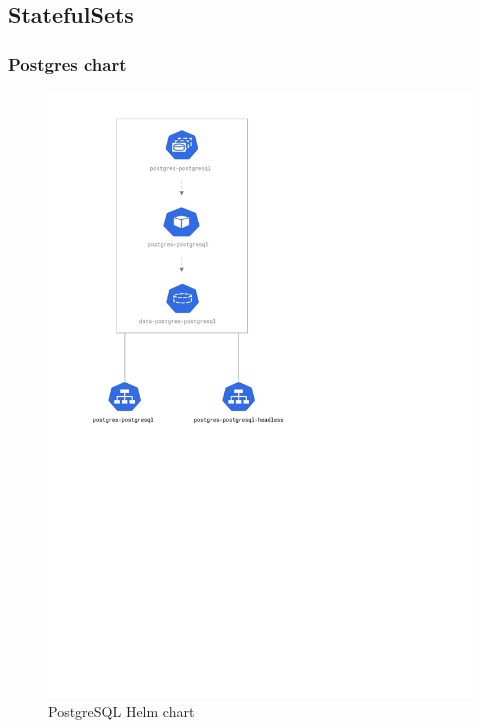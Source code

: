 \documentclass[thesis=B,english]{FITthesis}[2019/12/23]
\begin{document}
\subsection{StatefulSets}

\subsubsection{Postgres chart}
\begin{figure}[H]
\centering
\caption{PostgreSQL Helm chart}
\hspace*{1cm}
\includegraphics[scale=0.5]{postgres-diagram}
\end{figure}
\end{document}
